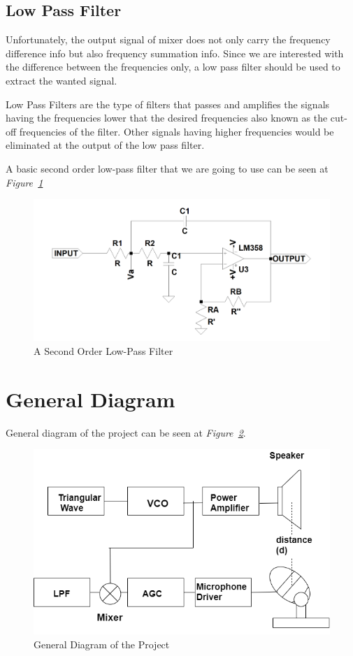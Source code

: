 \documentclass[paper]{IEEEtran}
\begin{document}
\vfill
		
\subsection{Low Pass Filter}
\- \indent
	Unfortunately, the output signal of mixer does not only carry the frequency difference info but also frequency summation info. Since we are interested with the difference between the frequencies only, a low pass filter should be used to extract the wanted signal.
	
	Low Pass Filters are the type of filters that passes and amplifies the signals having the frequencies lower that the desired frequencies also known as the cut-off frequencies of the filter. Other signals having higher frequencies would be eliminated at the output of the low pass filter. 	

	A basic second order low-pass filter that we are going to use can be seen at \textit{Figure~\ref{fig:lpf}} 
 
\begin{figure}[h!]
\setlength{\unitlength}{\textwidth}
\center 
\includegraphics[width=0.5\unitlength]{solpf.png}
\caption{\label{fig:lpf} A Second Order Low-Pass Filter }
\end{figure}	

		
\section{General Diagram}
\- \indent
	General diagram of the project can be seen at \textit{Figure~\ref{fig:diagram}}.

\begin{figure}[h!]
\setlength{\unitlength}{\textwidth}
\center 
\includegraphics[width=0.5\unitlength]{diagram3.png}
\caption{\label{fig:diagram} General Diagram of the Project }
\end{figure}	
\end{document}
